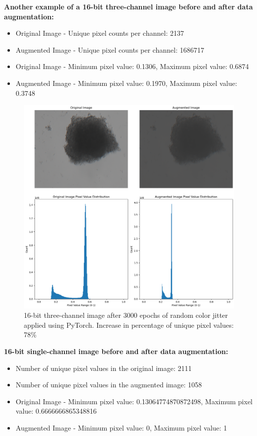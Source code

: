 \textbf{Another example of a 16-bit three-channel image before and after data augmentation:}

\begin{itemize}
  \item Original Image - Unique pixel counts per channel: 2137
  \item Augmented Image - Unique pixel counts per channel: 1686717
  \item Original Image - Minimum pixel value: 0.1306, Maximum pixel value: 0.6874
  \item Augmented Image -  Minimum pixel value: 0.1970, Maximum pixel value: 0.3748
\end{itemize}

\begin{figure}[H]
  \centering
  \includegraphics[scale=0.5]{figures/16bithree2.png} 
  \caption{16-bit three-channel image after 3000 epochs of random color jitter applied using PyTorch. Increase in percentage of unique pixel values: 78\%}
  \label{fig:16bit_three_version2}
\end{figure}

\textbf{16-bit single-channel image before and after data augmentation:}
\begin{itemize}
  \item Number of unique pixel values in the original image: 2111
  \item Number of unique pixel values in the augmented image: 1058
  \item Original Image - Minimum pixel value:  0.13064774870872498, Maximum pixel value: 0.6666666865348816
  \item Augmented Image - Minimum pixel value: 0, Maximum pixel value: 1
\end{itemize}

